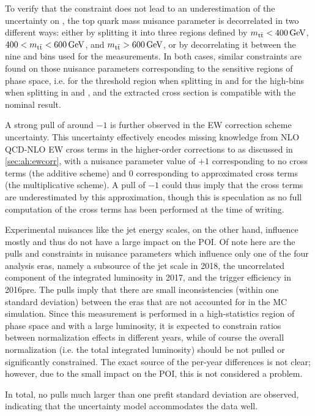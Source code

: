 To verify that the constraint does not lead to an underestimation of the uncertainty on \sigetat, the top quark mass nuisance parameter is decorrelated in two different ways: either by splitting it into three regions defined by $\mtt<\SI{400}{\GeV}$, $400<\mtt<\SI{600}{\GeV}$, and $\mtt>\SI{600}{\GeV}$, or by decorrelating it between the nine \chel and \chan bins used for the measurements. In both cases, similar constraints are found on those nuisance parameters corresponding to the sensitive regions of phase space, i.e. for the threshold region when splitting in \mtt and for the high-\chel bins when splitting in \chel and \chan, and the extracted \etat cross section is compatible with the nominal result.

A strong pull of around $-1$ is further observed in the EW correction scheme uncertainty. This uncertainty effectively encodes missing knowledge from NLO QCD-NLO EW cross terms in the higher-order corrections to \ttbar as discussed in \cref{sec:ah:ewcorr}, with a nuisance parameter value of $+1$ corresponding to no cross terms (the additive scheme) and $0$ corresponding to approximated cross terms (the multiplicative scheme). A pull of $-1$ could thus imply that the cross terms are underestimated by this approximation, though this is speculation as no full computation of the cross terms has been performed at the time of writing.

Experimental nuisances like the jet energy scales, on the other hand, influence mostly \mtt and thus do not have a large impact on the POI. 
Of note here are the pulls and constraints in nuisance parameters which influence only one of the four analysis eras, namely a subsource of the jet \pt scale in 2018, the uncorrelated component of the integrated luminosity in 2017, and the \emu trigger efficiency in 2016pre. The pulls imply that there are small inconsistencies (within one standard deviation) between the eras that are not accounted for in the MC simulation. Since this measurement is performed in a high-statistics region of phase space and with a large luminosity, it is expected to constrain ratios between normalization effects in different years, while of course the overall normalization (i.e. the total integrated luminosity) should be not pulled or significantly constrained.
The exact source of the per-year differences is not clear; however, due to the small impact on the POI, this is not considered a problem.

In total, no pulls much larger than one prefit standard deviation are observed, indicating that the uncertainty model accommodates the data well.

